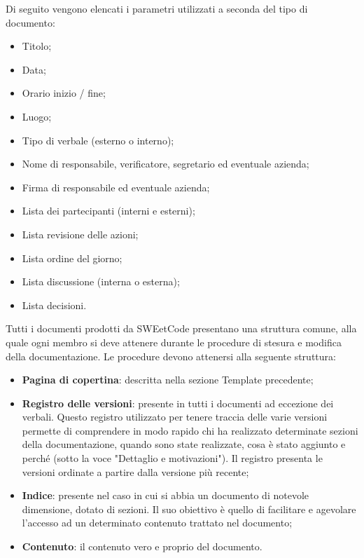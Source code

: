 \documentclass[10pt, a4paper]{article}
\begin{document}
    Di seguito vengono elencati i parametri utilizzati a seconda del tipo di documento:
    \begin{itemize}
        \item Titolo;
        \item Data;
        \item Orario inizio / fine;
        \item Luogo;
        \item Tipo di verbale (esterno o interno);
        \item Nome di responsabile, verificatore, segretario ed eventuale azienda;
        \item Firma di responsabile ed eventuale azienda;
        \item Lista dei partecipanti (interni e esterni);
        \item Lista revisione delle azioni;
        \item Lista ordine del giorno;
        \item Lista discussione (interna o esterna);
        \item Lista decisioni.
    \end{itemize}
    
    Tutti i documenti prodotti da SWEetCode presentano una struttura comune, alla quale ogni membro si deve attenere durante le procedure di stesura e modifica della documentazione. Le procedure devono attenersi  alla seguente struttura:
    \begin{itemize}
        \item \textbf{Pagina di copertina}: descritta nella sezione Template precedente;
        \item \textbf{Registro delle versioni}: presente in tutti i documenti ad eccezione dei verbali. Questo registro utilizzato per 
        tenere traccia delle varie versioni permette di comprendere in modo rapido chi ha realizzato determinate sezioni della 
        documentazione, quando sono state realizzate, cosa è stato aggiunto e perché (sotto la voce "Dettaglio e motivazioni"). Il registro 
        presenta le versioni ordinate a partire dalla versione più recente; 
        \item \textbf{Indice}: presente nel caso in cui si abbia un documento di notevole dimensione, dotato di sezioni. Il suo obiettivo è 
        quello di facilitare e agevolare l'accesso ad un determinato contenuto trattato nel documento;
        \item \textbf{Contenuto}: il contenuto vero e proprio del documento.
    \end{itemize}
    
\end{document}
